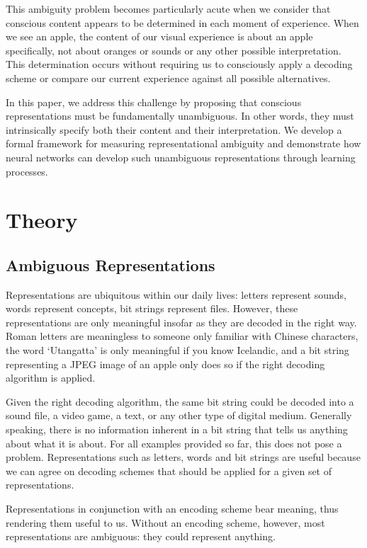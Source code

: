 \documentclass[11pt]{article}
\begin{document}
This ambiguity problem becomes particularly acute when we consider that conscious content appears to be determined in each moment of experience. When we see an apple, the content of our visual experience is about an apple specifically, not about oranges or sounds or any other possible interpretation. This determination occurs without requiring us to consciously apply a decoding scheme or compare our current experience against all possible alternatives.

In this paper, we address this challenge by proposing that conscious representations must be fundamentally unambiguous. In other words, they must intrinsically specify both their content and their interpretation. We develop a formal framework for measuring representational ambiguity and demonstrate how neural networks can develop such unambiguous representations through learning processes.

\section{Theory}

\subsection{Ambiguous Representations}

Representations are ubiquitous within our daily lives: letters represent sounds, words represent concepts, bit strings represent files. However, these representations are only meaningful insofar as they are decoded in the right way. Roman letters are meaningless to someone only familiar with Chinese characters, the word `Utangatta' is only meaningful if you know Icelandic, and a bit string representing a JPEG image of an apple only does so if the right decoding algorithm is applied.

Given the right decoding algorithm, the same bit string could be decoded into a sound file, a video game, a text, or any other type of digital medium. Generally speaking, there is no information inherent in a bit string that tells us anything about what it is about. For all examples provided so far, this does not pose a problem. Representations such as letters, words and bit strings are useful because we can agree on decoding schemes that should be applied for a given set of representations.

Representations in conjunction with an encoding scheme bear meaning, thus rendering them useful to us. Without an encoding scheme, however, most representations are ambiguous: they could represent anything.
\end{document}
